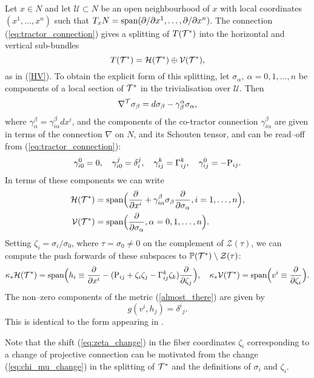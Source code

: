 Let $x\in N$ and let ${\mathcal U}\subset N$ be an open 
neighbourhood of $x$ with 
local coordinates $(x^1, \dots, x^n)$ such that
$T_xN=\mbox{span}(\partial/\partial x^1, \dots, \partial/\partial x^n)$. The connection 
(\ref{eq:tractor_connection}) gives a splitting of $T(\mathcal{T}^*)$ into the horizontal and
vertical sub-bundles
\[
T(\mathcal{T}^*)=\mathcal{H}(\mathcal{T}^*)\oplus \mathcal{V}(\mathcal{T}^*),
\]
as in (\ref{HV}).
To obtain the explicit form of this splitting, let $\sigma_\alpha,\ \alpha=0, 1, \dots, n$ be components of a local section of $\mathcal{T}^*$ in the trivialisation over ${\mathcal{U}}$.
Then
\[
\nabla^{\mathcal{T}} \sigma_\beta=d \sigma_\beta-\gamma_{\beta}^{\alpha} \sigma_\alpha,
\]
where $\gamma_{\alpha}^\beta= \gamma_{i\alpha}^\beta dx^i$, and the components
of the co-tractor connection 
$\gamma_{i\alpha}^\beta$  are given in terms of the connection
$\nabla$ on $N$, and its Schouten tensor, and 
can be read--off from (\ref{eq:tractor_connection}):
\[
\gamma_{i0}^0=0, \quad \gamma_{i0}^j=\delta_i^j,\quad
\gamma_{ij}^k=\Gamma_{ij}^k, \quad \gamma_{ij}^0=-\mathrm{P}_{ij}.
\]
In terms of these components we can write
\begin{align*}
\mathcal{H}(\mathcal{T}^*)&=\mbox{span}
\Big( \frac{\partial}{\partial x^i}+ {\gamma_{i\alpha}^\beta} \sigma_\beta
\frac{\partial}{\partial \sigma_{\alpha}}, i=1, \dots, n \Big), \\
 \mathcal{V}(\mathcal{T}^*)&=\mbox{span}\Big(\frac{\partial}{\partial \sigma_{\alpha}}, \alpha=0, 1, 
\dots, n\Big).
\end{align*}
Setting $\zeta_i=\sigma_i/\sigma_0$, where $\tau=\sigma_0\neq 0$ %
on the complement of 
$\mathcal{Z}(\tau)$, 
  we can compute the push forwards
of these subspaces to $\mathbb{P}(\mathcal{T}^*)\setminus {\mathcal{Z}(\tau)}$:
\[
\kappa_* \mathcal{H}(\mathcal{T}^*)=\mbox{span}\Big(h_i\equiv
\frac{\partial}{\partial x^i}-
(\mathrm{P}_{ij}+\zeta_i\zeta_j  -\Gamma_{ij}^k\zeta_k)\frac{\partial}{\partial \zeta_j}
\Big), \quad \kappa_* \mathcal{V}(\mathcal{T}^*)=\mbox{span}\Big(v^i\equiv\frac{\partial}{\partial \zeta_i}
\Big).
\]
The non--zero components of the  metric (\ref{almost_there}) are given by
\[
g(v^i, h_j)={\delta^i}_j.
\]
This is identical to the form appearing in \cite{DM}.
\koniec

\begin{rmk}
Note that the shift (\ref{eq:zeta_change}) in the fiber coordinates $\zeta_{i}$ corresponding to a change of projective connection can be motivated from the change (\ref{eq:chi_mu_change}) in the splitting of $\mathcal{T}^*$ and the definitions of $\sigma_i$ and $\zeta_i$.
\end{rmk}

